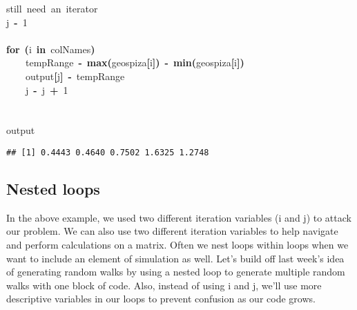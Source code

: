 \documentclass{article}\usepackage{graphicx, color}
\makeatletter
\newcommand{\hlnumber}[1]{\textcolor[rgb]{0,0,0}{#1}}%
\newcommand{\hlfunctioncall}[1]{\textcolor[rgb]{0.501960784313725,0,0.329411764705882}{\textbf{#1}}}%
\newcommand{\hlkeyword}[1]{\textcolor[rgb]{0,0,0}{\textbf{#1}}}%
\newcommand{\hlcomment}[1]{\textcolor[rgb]{0.180392156862745,0.6,0.341176470588235}{#1}}%
\newcommand{\hlassignement}[1]{\textcolor[rgb]{0,0,0}{\textbf{#1}}}%
\newcommand{\hlsymbol}[1]{\textcolor[rgb]{0,0,0}{#1}}%
\newcommand{\hlstd}[1]{\textcolor[rgb]{0,0,0}{#1}}%
\newenvironment{kframe}{%
 \def\FrameCommand##1{\hskip\@totalleftmargin \hskip-\fboxsep
 \colorbox{shadecolor}{##1}\hskip-\fboxsep
     \hskip-\linewidth \hskip-\@totalleftmargin \hskip\columnwidth}%
 \MakeFramed {\advance\hsize-\width
   \@totalleftmargin\z@ \linewidth\hsize
   \@setminipage}}%
 {\par\unskip\endMakeFramed}
\newenvironment{knitrout}{}{} %
\makeatother
\begin{document}
\begin{knitrout}
\begin{kframe}
\begin{flushleft}
\hlstd{}\hlcomment{\usebox{\hlnormalsizeboxhash}{\ }still{\ }need{\ }an{\ }iterator}\hspace*{\fill}\\
\hlstd{}\hlsymbol{j}{\ }\hlassignement{\usebox{\hlnormalsizeboxlessthan}-}{\ }\hlnumber{1}\hspace*{\fill}\\
\hlstd{}\hspace*{\fill}\\
\hlstd{}\hlkeyword{for}{\ }\hlkeyword{(}\hlsymbol{i}{\ }\hlkeyword{in}{\ }\hlsymbol{colNames}\hlkeyword{)}{\ }\hlkeyword{\usebox{\hlnormalsizeboxopenbrace}}\hspace*{\fill}\\
\hlstd{}{\ }{\ }{\ }{\ }\hlsymbol{tempRange}{\ }\hlassignement{\usebox{\hlnormalsizeboxlessthan}-}{\ }\hlfunctioncall{max}\hlkeyword{(}\hlsymbol{geospiza}\hlkeyword{[}\hlsymbol{i}\hlkeyword{]}\hlkeyword{)}{\ }\hlkeyword{-}{\ }\hlfunctioncall{min}\hlkeyword{(}\hlsymbol{geospiza}\hlkeyword{[}\hlsymbol{i}\hlkeyword{]}\hlkeyword{)}\hspace*{\fill}\\
\hlstd{}{\ }{\ }{\ }{\ }\hlsymbol{output}\hlkeyword{[}\hlsymbol{j}\hlkeyword{]}{\ }\hlassignement{\usebox{\hlnormalsizeboxlessthan}-}{\ }\hlsymbol{tempRange}\hspace*{\fill}\\
\hlstd{}{\ }{\ }{\ }{\ }\hlsymbol{j}{\ }\hlassignement{\usebox{\hlnormalsizeboxlessthan}-}{\ }\hlsymbol{j}{\ }\hlkeyword{+}{\ }\hlnumber{1}\hspace*{\fill}\\
\hlstd{}\hlkeyword{\usebox{\hlnormalsizeboxclosebrace}}\hspace*{\fill}\\
\hlstd{}\hspace*{\fill}\\
\hlstd{}\hlsymbol{output}\mbox{}
\normalfont
\end{flushleft}
\begin{verbatim}
## [1] 0.4443 0.4640 0.7502 1.6325 1.2748
\end{verbatim}
\end{kframe}
\end{knitrout}


\subsection{Nested loops}
In the above example, we used two different iteration variables (i and j) to attack our problem. We can also use two different iteration variables to help navigate and perform calculations on a matrix. Often we nest loops within loops when we want to include an element of simulation as well. Let's build off last week's idea of generating random walks by using a nested loop to generate multiple random walks with one block of code. Also, instead of using i and j, we'll use more descriptive variables in our loops to prevent confusion as our code grows.
\end{document}
